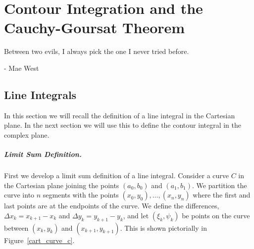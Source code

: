 
\flushbottom







\chapter{Contour Integration and the Cauchy-Goursat Theorem}






Between two evils, I always pick the one I never tried before.

\begin{flushright}
  - Mae West
\end{flushright}







\section{Line Integrals}


In this section we will recall the definition of a line integral
in the Cartesian plane.  In the next section we
will use this to define the contour integral in the complex plane.


\paragraph{Limit Sum Definition.}
First we develop a limit sum definition of a line integral.
Consider a curve $C$ in the Cartesian plane joining the points $(a_0,b_0)$
and $(a_1,b_1)$.  We partition the curve into $n$ segments with the points
$(x_0,y_0), \ldots, (x_n,y_n)$  where the first and last points are at
the endpoints of the curve.  We define the differences, $\Delta x_k = x_{k+1} - x_k$ and 
$\Delta y_k = y_{k+1} - y_k$, and let $(\xi_k,\psi_k)$ be points on the 
curve between $(x_k,y_k)$ and $(x_{k+1},y_{k+1})$.  This is shown pictorially in 
Figure~\ref{cart_curve_c}.

